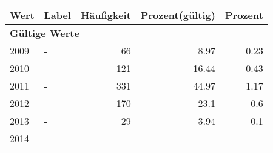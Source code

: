      \begin{longtable}{lXrrr}
     \toprule
     \textbf{Wert} & \textbf{Label} & \textbf{Häufigkeit} & \textbf{Prozent(gültig)} & \textbf{Prozent} \\
     \endhead
     \midrule
     \multicolumn{5}{l}{\textbf{Gültige Werte}}\\

     2009 &
     \multicolumn{1}{X}{ -  } &


       \num{66} &
       \num[round-mode=places,round-precision=2]{8.97} &
         \num[round-mode=places,round-precision=2]{0.23} \\

     2010 &
     \multicolumn{1}{X}{ -  } &


       \num{121} &
       \num[round-mode=places,round-precision=2]{16.44} &
         \num[round-mode=places,round-precision=2]{0.43} \\

     2011 &
     \multicolumn{1}{X}{ -  } &


       \num{331} &
       \num[round-mode=places,round-precision=2]{44.97} &
         \num[round-mode=places,round-precision=2]{1.17} \\

     2012 &
     \multicolumn{1}{X}{ -  } &


       \num{170} &
       \num[round-mode=places,round-precision=2]{23.1} &
         \num[round-mode=places,round-precision=2]{0.6} \\

     2013 &
     \multicolumn{1}{X}{ -  } &


       \num{29} &
       \num[round-mode=places,round-precision=2]{3.94} &
         \num[round-mode=places,round-precision=2]{0.1} \\

     2014 &
     \multicolumn{1}{X}{ -  } &



\end{longtable}
